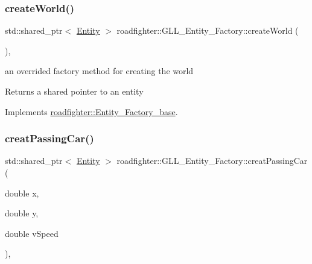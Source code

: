 \mbox{\label{classroadfighter_1_1GLL__Entity__Factory_a80f9f647f1192ddc098b2aa4f0172168}} 
\subsubsection{\texorpdfstring{create\+World()}{createWorld()}}
{\footnotesize\ttfamily std\+::shared\+\_\+ptr$<$ \hyperlink{classroadfighter_1_1Entity}{Entity} $>$ roadfighter\+::\+G\+L\+L\+\_\+\+Entity\+\_\+\+Factory\+::create\+World (\begin{DoxyParamCaption}{ }\end{DoxyParamCaption})\hspace{0.3cm}{\ttfamily [override]}, {\ttfamily [virtual]}}

an overrided factory method for creating the world \begin{DoxyReturn}{Returns}
a shared pointer to an entity 
\end{DoxyReturn}


Implements \hyperlink{classroadfighter_1_1Entity__Factory__base_aa24de6bbeb80c25e96f3e24d6bcb5169}{roadfighter\+::\+Entity\+\_\+\+Factory\+\_\+base}.

\mbox{\label{classroadfighter_1_1GLL__Entity__Factory_aa176b2bec6007989c5cf3658840123c7}} 
\subsubsection{\texorpdfstring{creat\+Passing\+Car()}{creatPassingCar()}}
{\footnotesize\ttfamily std\+::shared\+\_\+ptr$<$ \hyperlink{classroadfighter_1_1Entity}{Entity} $>$ roadfighter\+::\+G\+L\+L\+\_\+\+Entity\+\_\+\+Factory\+::creat\+Passing\+Car (\begin{DoxyParamCaption}\item[{double}]{x,  }\item[{double}]{y,  }\item[{double}]{v\+Speed }\end{DoxyParamCaption})\hspace{0.3cm}{\ttfamily [override]}, {\ttfamily [virtual]}}

